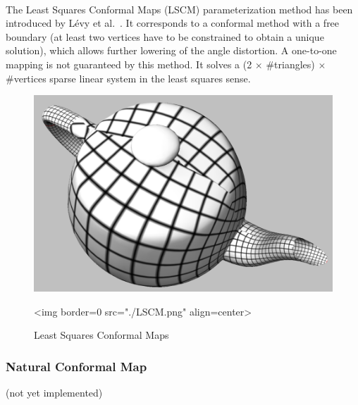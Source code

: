   \\

The Least Squares Conformal Maps (LSCM) parameterization method has
been introduced by L\'evy et al.~\cite{cgal:lprm-lscm-02}. It
corresponds to a conformal method with a free boundary (at least two
vertices have to be constrained to obtain a unique solution), which
allows further lowering of the angle distortion. A one-to-one mapping
is not guaranteed by this method. It solves a (2 $\times$
\#triangles) $\times$ \#vertices sparse linear system in the least squares sense.

\begin{figure}[bht]
    \begin{center}
        \begin{ccTexOnly}
            \includegraphics{Parameterization/LSCM} %
        \end{ccTexOnly}
        \begin{ccHtmlOnly}
            <img border=0 src="./LSCM.png" align=center>
        \end{ccHtmlOnly}
        \label{parameterization-fig-LSCM}

        \caption{Least Squares Conformal Maps}
    \end{center}
\end{figure}


\subsubsection{Natural Conformal Map}

(not yet implemented)

